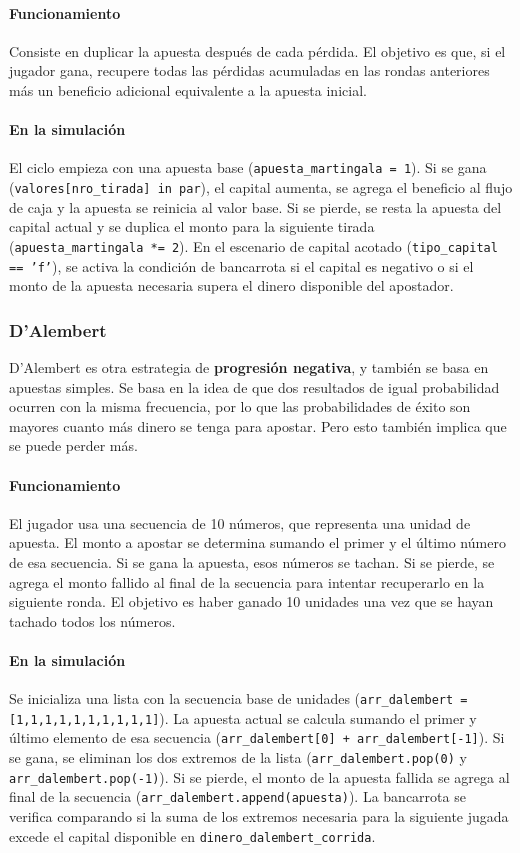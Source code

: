 \documentclass{article}
\begin{document}
\paragraph{Funcionamiento} Consiste en duplicar la apuesta después de cada pérdida. El objetivo es que, si el jugador gana, recupere todas las pérdidas acumuladas en las rondas anteriores más un beneficio adicional equivalente a la apuesta inicial.\cite{martingala}

\paragraph{En la simulación} El ciclo empieza con una apuesta base (\texttt{apuesta\_martingala = 1}). Si se gana (\texttt{valores[nro\_tirada] in par}), el capital aumenta, se agrega el beneficio al flujo de caja y la apuesta se reinicia al valor base. Si se pierde, se resta la apuesta del capital actual y se duplica el monto para la siguiente tirada (\texttt{apuesta\_martingala *= 2}). En el escenario de capital acotado (\texttt{tipo\_capital == 'f'}), se activa la condición de bancarrota si el capital es negativo o si el monto de la apuesta necesaria supera el dinero disponible del apostador.

\subsubsection{D’Alembert}
D’Alembert es otra estrategia de \textbf{progresión negativa}, y también se basa en apuestas simples. Se basa en la idea de que dos resultados de igual probabilidad ocurren con la misma frecuencia, por lo que las probabilidades de éxito son mayores cuanto más dinero se tenga para apostar. Pero esto también implica que se puede perder más.

\paragraph{Funcionamiento} El jugador usa una secuencia de 10 números, que representa una unidad de apuesta. El monto a apostar se determina sumando el primer y el último número de esa secuencia. Si se gana la apuesta, esos números se tachan. Si se pierde, se agrega el monto fallido al final de la secuencia para intentar recuperarlo en la siguiente ronda. El objetivo es haber ganado 10 unidades una vez que se hayan tachado todos los números.\cite{dalembert}

\paragraph{En la simulación} Se inicializa una lista con la secuencia base de unidades (\texttt{arr\_dalembert = [1,1,1,1,1,1,1,1,1,1]}). La apuesta actual se calcula sumando el primer y último elemento de esa secuencia (\texttt{arr\_dalembert[0] + arr\_dalembert[-1]}). Si se gana, se eliminan los dos extremos de la lista (\texttt{arr\_dalembert.pop(0)} y \texttt{arr\_dalembert.pop(-1)}). Si se pierde, el monto de la apuesta fallida se agrega al final de la secuencia (\texttt{arr\_dalembert.append(apuesta)}). La bancarrota se verifica comparando si la suma de los extremos necesaria para la siguiente jugada excede el capital disponible en \texttt{dinero\_dalembert\_corrida}.
\end{document}
